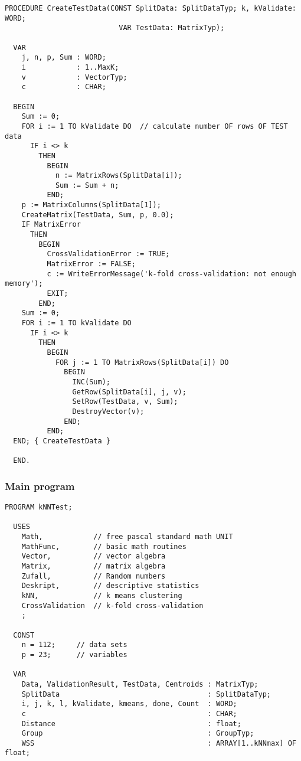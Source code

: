 \begin{refsection}
\begin{lstlisting}[caption=k-fold crossvalidation]
  PROCEDURE CreateTestData(CONST SplitData: SplitDataTyp; k, kValidate: WORD;
                           VAR TestData: MatrixTyp);

  VAR
    j, n, p, Sum : WORD;
    i            : 1..MaxK;
    v            : VectorTyp;
    c            : CHAR;

  BEGIN
    Sum := 0;
    FOR i := 1 TO kValidate DO  // calculate number OF rows OF TEST data
      IF i <> k
        THEN
          BEGIN
            n := MatrixRows(SplitData[i]);
            Sum := Sum + n;
          END;
    p := MatrixColumns(SplitData[1]);
    CreateMatrix(TestData, Sum, p, 0.0);
    IF MatrixError
      THEN
        BEGIN
          CrossValidationError := TRUE;
          MatrixError := FALSE;
          c := WriteErrorMessage('k-fold cross-validation: not enough memory');
          EXIT;
        END;
    Sum := 0;
    FOR i := 1 TO kValidate DO
      IF i <> k
        THEN
          BEGIN
            FOR j := 1 TO MatrixRows(SplitData[i]) DO
              BEGIN
                INC(Sum);
                GetRow(SplitData[i], j, v);
                SetRow(TestData, v, Sum);
                DestroyVector(v);
              END;
          END;
  END; { CreateTestData }

  END.
\end{lstlisting}

\subsubsection{Main program}

\begin{lstlisting}[caption=Main program]
  PROGRAM kNNTest;

  USES
    Math,            // free pascal standard math UNIT
    MathFunc,        // basic math routines
    Vector,          // vector algebra
    Matrix,          // matrix algebra
    Zufall,          // Random numbers
    Deskript,        // descriptive statistics
    kNN,             // k means clustering
    CrossValidation  // k-fold cross-validation
    ;

  CONST
    n = 112;     // data sets
    p = 23;      // variables

  VAR
    Data, ValidationResult, TestData, Centroids : MatrixTyp;
    SplitData                                   : SplitDataTyp;
    i, j, k, l, kValidate, kmeans, done, Count  : WORD;
    c                                           : CHAR;
    Distance                                    : float;
    Group                                       : GroupTyp;
    WSS                                         : ARRAY[1..kNNmax] OF float;


\end{lstlisting}
\end{refsection}
